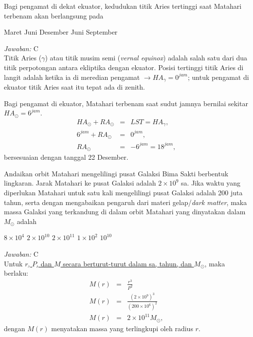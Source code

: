 \documentclass[11pt,fleqn]{exam}
\begin{document}
\begin{questions}

\question Bagi pengamat di dekat ekuator, kedudukan titik Aries tertinggi saat Matahari terbenam akan berlangsung pada
\begin{choices}
 Maret
 Juni
 Desember
 Juni
 September
\end{choices}

\textit{Jawaban: }C\\
Titik Aries ($\gamma$) atau titik musim semi (\textit{vernal equinox}) adalah salah satu dari dua titik perpotongan antara ekliptika dengan ekuator. Posisi tertinggi titik Aries di langit adalah ketika ia di meredian pengamat $\rightarrow HA_{\gamma}=0^{jam}$; untuk pengamat di ekuator titik Aries saat itu tepat ada di zenith. 

Bagi pengamat di ekuator, Matahari terbenam saat sudut jamnya bernilai sekitar $HA_{\odot}=6^{jam}$.
\begin{eqnarray*}
HA_{\odot}+RA_{\odot} &=& LST = HA_{\gamma},\\
6^{jam}+RA_{\odot}&=&0^{jam},\\
RA_{\odot}&=&-6^{jam}=18^{jam},
\end{eqnarray*}
bersesuaian dengan tanggal 22 Desember.

\question Andaikan orbit Matahari mengelilingi pusat Galaksi Bima Sakti berbentuk lingkaran. Jarak Matahari ke pusat Galaksi adalah $2\times 10^9$ sa. Jika waktu yang diperlukan Matahari untuk satu kali mengelilingi pusat Galaksi adalah 200 juta tahun, serta dengan mengabaikan pengaruh dari materi gelap/\textit{dark matter}, maka massa Galaksi yang terkandung di dalam orbit Matahari yang dinyatakan dalam $M_{\odot}$ adalah
\begin{choices}
\choice $8\times 10^4$
\choice $2\times 10^{10}$
\choice $2\times 10^{11}$
\choice $1\times 10^2$
\choice $10^{10}$
\end{choices}

\textit{Jawaban: }C\\
Untuk \underline{$r$, $P$, dan $M$ secara berturut-turut dalam sa, tahun, dan $M_{\odot}$}, maka berlaku:
\begin{eqnarray*}
M(r)&=&\frac{r^3}{P^2}\\
M(r)&=&\frac{(2\times 10^9)^3}{(200\times 10^6)^2}\\
M(r)&=&2\times 10^{11} M_{\odot},
\end{eqnarray*}
dengan $M(r)$ menyatakan massa yang terlingkupi oleh radius $r$.


\end{questions}
\end{document}
